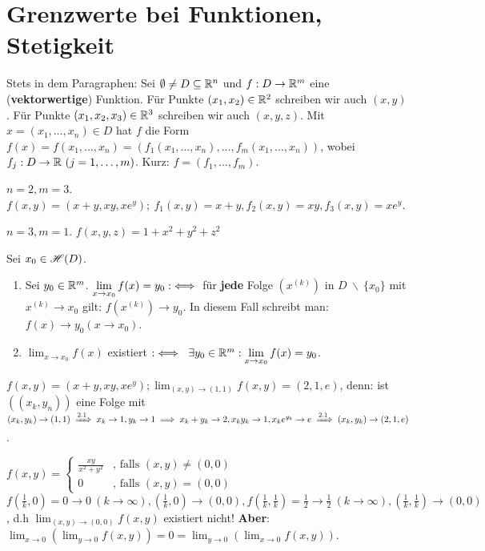 \documentclass[a4paper,oneside,DIV15,BCOR12mm,chapterprefix=true,headings=onelinechapter]{scrbook}
\begin{document}
\chapter{Grenzwerte bei Funktionen, Stetigkeit}

\begin{vereinbarung}
Stets in dem Paragraphen: Sei $\emptyset \ne D \subseteq \mathbb{R}^n$ und $f: D\to\mathbb{R}^m$ eine (\textbf{vektorwertige}) Funktion. Für Punkte $(x_1, x_2) \in \mathbb{R}^2$ schreiben wir auch $(x,y)$. Für Punkte $(x_1, x_2, x_3) \in\mathbb{R}^3$ schreiben wir auch $(x, y, z)$. Mit $x=(x_1,\ldots,x_n)\in D$ hat $f$ die Form $f(x)=f(x_1,\ldots,x_n)=(f_1(x_1,\ldots,x_n),\ldots,f_m(x_1,\ldots,x_n))$, wobei $f_j:D\to\mathbb{R}\ (j=1,\ldots,m)$. Kurz: $f=(f_1,\ldots,f_m)$.
\end{vereinbarung}

\begin{beispiele}
\item $n=2,m=3$. $f(x,y)=(x+y,xy,xe^y);\ f_1(x,y)=x+y, f_2(x,y)=xy, f_3(x,y)=xe^y$.
\item $n=3,m=1$. $f(x,y,z)=1+x^2+y^2+z^2$
\end{beispiele}

\begin{definition*}
Sei $x_0\in \mathscr{H}(D)$.

\begin{enumerate}
\item Sei $y_0 \in \mathbb{R}^m$. $\displaystyle\lim_{x\to x_0}f(x)=y_0 :\iff$ für \textbf{jede} Folge $(x^{(k)})$ in $D\ \backslash\ \{x_0\}$ mit $x^{(k)}\to x_0$ gilt: $f(x^{(k)})\to y_0$. In diesem Fall schreibt man: $f(x)\to y_0(x\to x_0)$.
\item $\displaystyle\lim_{x\to x_0}f(x)$ existiert $:\iff\ \exists y_0 \in \mathbb{R}^m: \displaystyle\lim_{x\to x_0}f(x)=y_0$.
\end{enumerate}
\end{definition*}

\begin{beispiele}
\item $f(x,y)=(x+y,xy,xe^y); \displaystyle\lim_{(x,y)\to(1,1)}f(x,y)=(2,1,e)$, denn: ist $((x_k, y_n))$ eine Folge mit $(x_k,y_k)\to(1,1)\folgtnach{2.1}x_k\to 1, y_k\to 1 \folgt x_k+y_k\to 2, x_ky_k\to 1, x_ke^{y_k}\to e\folgtnach{2.1}(x_k,y_k)\to(2,1,e)$.
\item $f(x,y)=\begin{cases}
\frac{xy}{x^2+y^2}&\text{, falls }(x,y)\ne(0,0)\\
0&\text{, falls }(x,y)=(0,0)
\end{cases}$\\
$f(\frac{1}{k},0)=0\to 0\ (k\to \infty), (\frac{1}{k},0)\to(0,0), f(\frac{1}{k},\frac{1}{k})=\frac{1}{2}\to\frac{1}{2}\ (k\to \infty), (\frac{1}{k},\frac{1}{k})\to(0,0)$, d.h $\displaystyle\lim_{(x,y)\to(0,0)}f(x,y)$ existiert nicht! \textbf{Aber}: $\displaystyle\lim_{x\to 0}(\displaystyle\lim_{y\to 0} f(x,y))=0=\displaystyle\lim_{y\to 0}(\displaystyle\lim_{x\to 0} f(x,y))$.
\end{beispiele}
\end{document}
